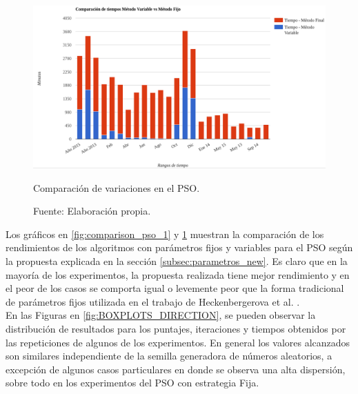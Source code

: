 \begin{figure}[ht!]
    \centering
    \captionsetup{justification=centering,margin=2cm}
        \includegraphics[width=\textwidth]{figures/comp_v1_v2_tiempo.png}   
    \caption{Comparación de variaciones en el PSO.}
    \caption*{Fuente: Elaboración propia.}
    \label{fig:comparison_pso_2}
\end{figure}
Los gráficos en \ref{fig:comparison_pso_1} y  \ref{fig:comparison_pso_2} muestran la comparación de los rendimientos de los algoritmos con parámetros fijos y variables para el PSO según la propuesta explicada en la sección \ref{subsec:parametros_new}. Es claro que en la mayoría de los experimentos, la propuesta realizada tiene mejor rendimiento y en el peor de los casos se comporta igual o levemente peor que la forma tradicional de parámetros fijos utilizada en el trabajo de Heckenbergerova et al. \cite{Heckenbergerova15}.\\
En las Figuras en \ref{fig:BOXPLOTS_DIRECTION}, se pueden observar la distribución de resultados para los puntajes, iteraciones y tiempos obtenidos por las repeticiones de algunos de los experimentos. En general los valores alcanzados son similares independiente de la semilla generadora de números aleatorios, a excepción de algunos casos particulares en donde se observa una alta dispersión, sobre todo en los experimentos del PSO con estrategia Fija.
\newpage
